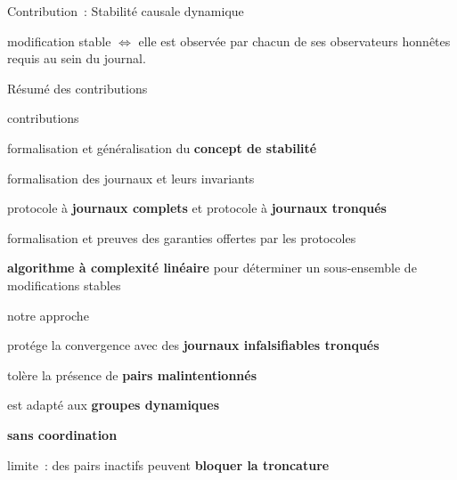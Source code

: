 \begin{frame}{Contribution~: Stabilité causale dynamique}
    \begin{minipage}{\textwidth}
    \end{minipage}
    \begin{minipage}{\textwidth}
        \begin{theorem}
            modification stable $\iff$ elle est observée par chacun de ses observateurs honnêtes requis au sein du journal.
        \end{theorem}
    \end{minipage}
\end{frame}


\begin{frame}{Résumé des contributions}
    \begin{compactitemize}
        \item contributions
        \begin{compactitemize}
            \item formalisation et généralisation du \textbf{concept de stabilité}
            \item formalisation des journaux et leurs invariants
            \item protocole à \textbf{journaux complets} et protocole à \textbf{journaux tronqués}
            \item formalisation et preuves des garanties offertes par les protocoles
            \item \textbf{algorithme à complexité linéaire} pour déterminer un sous-ensemble de modifications stables
        \end{compactitemize}
        \item notre approche
        \begin{compactitemize}
            \item protége la convergence avec des \textbf{journaux infalsifiables tronqués}
            \item tolère la présence de \textbf{pairs malintentionnés}
            \item est adapté aux \textbf{groupes dynamiques}
            \item \textbf{sans coordination}
        \end{compactitemize}
        \item limite~: des pairs inactifs peuvent \textbf{bloquer la troncature}
    \end{compactitemize}
\end{frame}

